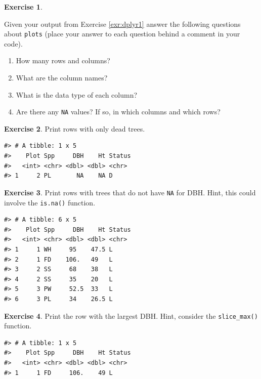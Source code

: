 \documentclass[
  11pt,
]{krantz}
\providecommand{\tightlist}{%
  \setlength{\itemsep}{0pt}\setlength{\parskip}{0pt}}
\theoremstyle{definition}
\theoremstyle{definition}
\theoremstyle{definition}
\newtheorem{exercise}{Exercise}[chapter]
\theoremstyle{definition}
\theoremstyle{remark}
\begin{document}
\begin{exercise}
\protect\hypertarget{exr:dplyr2}{}\label{exr:dplyr2}

Given your output from Exercise \ref{exr:dplyr1} answer the following questions about \texttt{plots} (place your answer to each question behind a comment in your code).

\begin{enumerate}
\def\labelenumi{\alph{enumi}.}
\tightlist
\item
  How many rows and columns?
\item
  What are the column names?
\item
  What is the data type of each column?
\item
  Are there any \texttt{NA} values? If so, in which columns and which rows?
\end{enumerate}

\end{exercise}

\begin{exercise}
\protect\hypertarget{exr:dplyr3}{}\label{exr:dplyr3}Print rows with only dead trees.
\end{exercise}

\begin{verbatim}
#> # A tibble: 1 x 5
#>    Plot Spp     DBH    Ht Status
#>   <int> <chr> <dbl> <dbl> <chr> 
#> 1     2 PL       NA    NA D
\end{verbatim}

\begin{exercise}
\protect\hypertarget{exr:dplyr4}{}\label{exr:dplyr4}Print rows with trees that do not have \texttt{NA} for DBH. Hint, this could involve the \texttt{is.na()} function.
\end{exercise}

\begin{verbatim}
#> # A tibble: 6 x 5
#>    Plot Spp     DBH    Ht Status
#>   <int> <chr> <dbl> <dbl> <chr> 
#> 1     1 WH     95    47.5 L     
#> 2     1 FD    106.   49   L     
#> 3     2 SS     68    38   L     
#> 4     2 SS     35    20   L     
#> 5     3 PW     52.5  33   L     
#> 6     3 PL     34    26.5 L
\end{verbatim}

\begin{exercise}
\protect\hypertarget{exr:dplyr5}{}\label{exr:dplyr5}Print the row with the largest DBH. Hint, consider the \texttt{slice\_max()} function.
\end{exercise}

\begin{verbatim}
#> # A tibble: 1 x 5
#>    Plot Spp     DBH    Ht Status
#>   <int> <chr> <dbl> <dbl> <chr> 
#> 1     1 FD     106.    49 L
\end{verbatim}
\end{document}
